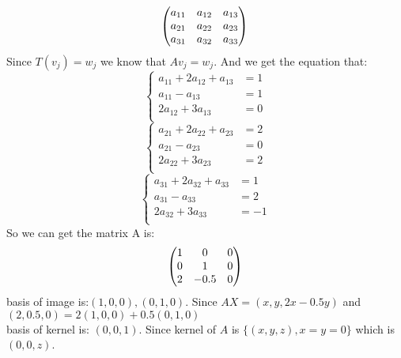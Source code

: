 \documentclass[12pt]{amsart}
\begin{document}
$$\begin{pmatrix} 
a_{11} & a_{12} & a_{13} \\
a_{21} & a_{22} & a_{23} \\
a_{31} & a_{32} & a_{33} \\
\end{pmatrix}\\
$$
Since $T(v_j) = w_j$ we know that $Av_j = w_j$. And we get the equation that:\\
$$ \left\{
\begin{aligned}
a_{11} + 2a_{12} + a_{13} & = 1 \\
a_{11} - a_{13} & = 1 \\
2a_{12} + 3a_{13} & = 0\\
\end{aligned}
\right.
$$
$$ \left\{
\begin{aligned}
a_{21} + 2a_{22} + a_{23} & = 2 \\
a_{21} - a_{23} & = 0 \\
2a_{22} + 3a_{23} & = 2\\
\end{aligned}
\right.
$$
$$ \left\{
\begin{aligned}
a_{31} + 2a_{32} + a_{33} & = 1 \\
a_{31} - a_{33} & = 2 \\
2a_{32} + 3a_{33} & = -1\\
\end{aligned}
\right.
$$
So we can get the matrix A is:\\
$$\begin{pmatrix} 
1 & 0 & 0 \\
0 & 1 & 0 \\
2 & -0.5 & 0 \\
\end{pmatrix}\\
$$
basis of image is:$(1,0,0),(0,1,0)$. Since $AX = (x,y,2x - 0.5y)$ and $(2,0.5,0) = 2(1,0,0) + 0.5(0,1,0)$\\
basis of kernel is: $(0,0,1)$. Since kernel of $A$ is $\{(x,y,z), x=y=0\}$ which is $(0,0,z)$.
\end{document}
